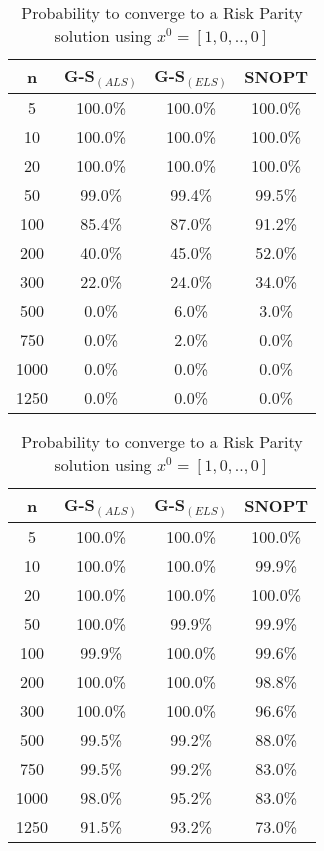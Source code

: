 \begin{table}
\begin{minipage}{.4\linewidth}
\centering
\begin{tabular}{ c | c | c | c }
n &  G-S$_{(ALS)}$ & G-S$_{(ELS)}$  & SNOPT \\\hline
5    & 100.0\% & 100.0\% & 100.0\%\\\hline
10   & 100.0\% & 100.0\% & 100.0\%\\\hline
20   & 100.0\% & 100.0\% & 100.0\%\\\hline
50   & 99.0\%  & 99.4\%  & 99.5\%\\\hline
100  & 85.4\%  & 87.0\%  & 91.2\%\\\hline
200  & 40.0\%  & 45.0\%  & 52.0\%\\\hline
300  & 22.0\%  & 24.0\%  & 34.0\%\\\hline
500  & 0.0\%   & 6.0\%   & 3.0\%\\\hline
750  & 0.0\%   & 2.0\%   & 0.0\%\\\hline
1000 & 0.0\%   & 0.0\%   & 0.0\%\\\hline
1250 & 0.0\%   & 0.0\%   & 0.0\%\\\hline
\end{tabular}
\label{tab:1}
\caption{Probability to converge to a Risk Parity solution using $x^{0}_i = 1/n \quad \forall i$}
\end{minipage}
\hfill
\begin{minipage}{.4\linewidth}
\centering
\begin{tabular}{ c | c| c | c}
n &  G-S$_{(ALS)}$ & G-S$_{(ELS)}$  & SNOPT \\\hline
5    & 100.0\%  & 100.0\% & 100.0\%\\\hline
10   & 100.0\%  & 100.0\% & 99.9\%\\\hline
20   & 100.0\%  & 100.0\%  & 100.0\%\\\hline
50   & 100.0\%  & 99.9\%  & 99.9\%\\\hline
100  & 99.9\%   & 100.0\%  & 99.6\% \\\hline
200  & 100.0\%  & 100.0\%  & 98.8\% \\\hline
300  & 100.0\%  & 100.0\%  & 96.6\% \\\hline
500  & 99.5\%   & 99.2\%   & 88.0\%\\\hline
750  & 99.5\%   & 99.2\%  & 83.0\%\\\hline
1000 & 98.0\%   & 95.2\%  & 83.0\%\\\hline
1250 & 91.5\%   & 93.2\%  & 73.0\%\\\hline
\end{tabular}
\label{tab:2}
\caption{Probability to converge to a Risk Parity solution using $x^{0}= [1, 0, .., 0]$}
\end{minipage}
\end{table}

